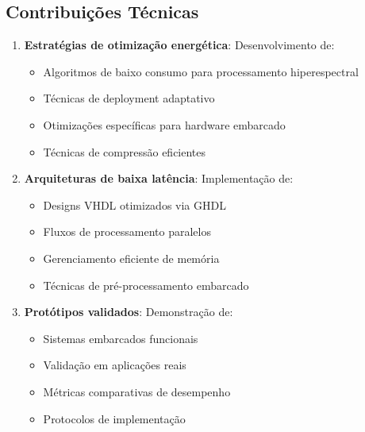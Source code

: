 \subsection{Contribuições Técnicas}
\begin{enumerate}
    \item \textbf{Estratégias de otimização energética}: Desenvolvimento de:
    \begin{itemize}
        \item Algoritmos de baixo consumo para processamento hiperespectral
        \item Técnicas de deployment adaptativo
        \item Otimizações específicas para hardware embarcado
        \item Técnicas de compressão eficientes
    \end{itemize}
    
    \item \textbf{Arquiteturas de baixa latência}: Implementação de:
    \begin{itemize}
        \item Designs VHDL otimizados via GHDL
        \item Fluxos de processamento paralelos
        \item Gerenciamento eficiente de memória
        \item Técnicas de pré-processamento embarcado
    \end{itemize}
    
    \item \textbf{Protótipos validados}: Demonstração de:
    \begin{itemize}
        \item Sistemas embarcados funcionais
        \item Validação em aplicações reais
        \item Métricas comparativas de desempenho
        \item Protocolos de implementação
    \end{itemize}
\end{enumerate}

